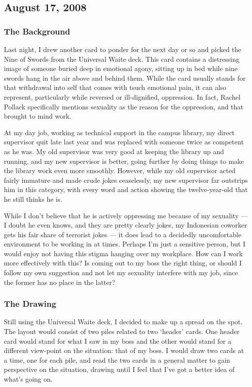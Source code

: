 \subsection{August 17, 2008}
\subsubsection*{The Background}
Last night, I drew another card to ponder for the next day or so and
picked the Nine of Swords from the Universal Waite deck\cite{tarotRWS}.
This card contains a distressing image of someone buried deep in
emotional agony, sitting up in bed while nine swords hang in the air
above and behind them.  While the card usually stands for that
withdrawal into self that comes with tsuch emotional pain, it can also
represent, particularly while reversed or ill-dignified, oppression.  In
fact, Rachel Pollack specifically mentions sexuality as the reason for
the oppression, and that brought to mind work.

At my day job, working as technical support in the campus library, my
direct supervisor quit late last year and was replaced with someone
twice as competent as he was.  My old supervisor was very good at
keeping the library up and running, and my new supervisor is better,
going further by doing things to make the library work even more
smoothly.  However, while my old supervisor acted fairly immature and
made crude jokes ceaselessly, my new supervisor far outstrips him in
this category, with every word and action showing the twelve-year-old
that he still thinks he is.

While I don't believe that he is actively oppressing me because of my
sexuality --- I doubt he even knows, and they are pretty clearly jokes,
my Indonesian coworker gets his fair share of terrorist jokes --- it
does lead to a decidedly uncomfortable environment to be working in at
times.  Perhaps I'm just a sensitive person, but I would enjoy not
having this stigma hanging over my workplace.  How can I work more
effectively with this?  Is coming out to my boss the right thing, or
should I follow my own suggestion and not let my sexuality interfere
with my job, since the former has no place in the latter?

\subsubsection*{The Drawing}
Still using the Universal Waite deck, I decided to make up a spread on
the spot.  The layout would consist of two piles related to two `header'
cards.  One header card would stand for what I saw in my boss and the
other would stand for a different view-point on the situation: that of 
my boss.  I would draw two cards at a time, one for each pile,
and read the two cards in a general matter to gain perspective on the
situation, drawing until I feel that I've got a better idea of what's
going on.

